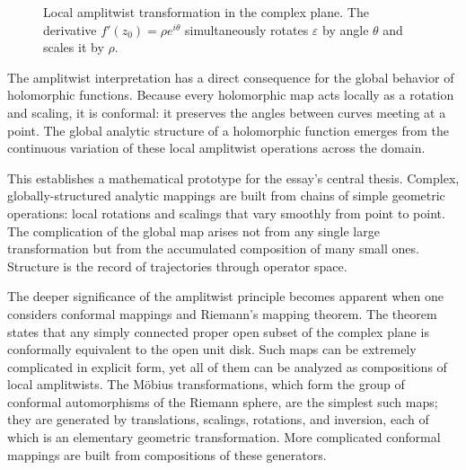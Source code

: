 \documentclass[11pt, a4paper]{article}
\theoremstyle{plain}
\theoremstyle{definition}
\theoremstyle{remark}
\begin{document}
\begin{figure}[h]
\centering
{}
\caption{Local amplitwist transformation in the complex plane. The derivative
$f'(z_0) = \rho e^{i\theta}$ simultaneously rotates $\varepsilon$ by angle $\theta$
and scales it by $\rho$.}
\end{figure}

The amplitwist interpretation has a direct consequence for the global behavior of
holomorphic functions. Because every holomorphic map acts locally as a rotation and
scaling, it is conformal: it preserves the angles between curves meeting at a point.
The global analytic structure of a holomorphic function emerges from the continuous
variation of these local amplitwist operations across the domain.

This establishes a mathematical prototype for the essay's central thesis. Complex,
globally-structured analytic mappings are built from chains of simple geometric
operations: local rotations and scalings that vary smoothly from point to point.
The complication of the global map arises not from any single large transformation but
from the accumulated composition of many small ones. Structure is the record of
trajectories through operator space.

The deeper significance of the amplitwist principle becomes apparent when one considers
conformal mappings and Riemann's mapping theorem. The theorem states that any simply
connected proper open subset of the complex plane is conformally equivalent to the open
unit disk. Such maps can be extremely complicated in explicit form, yet all of them can
be analyzed as compositions of local amplitwists. The Möbius transformations, which
form the group of conformal automorphisms of the Riemann sphere, are the simplest such
maps; they are generated by translations, scalings, rotations, and inversion, each of
which is an elementary geometric transformation. More complicated conformal mappings
are built from compositions of these generators.
\end{document}
